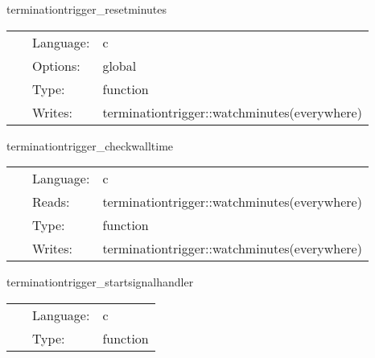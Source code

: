 \vspace{5mm}


\hspace{5mm} terminationtrigger\_resetminutes 

\hspace{5mm}{\it reset watchtime } 


\hspace{5mm}

 \begin{tabular*}{160mm}{cll} 
~ & Language:  & c \\ 
~ & Options:  & global \\ 
~ & Type:  & function \\ 
~ & Writes:  & terminationtrigger::watchminutes(everywhere) \\ 
\end{tabular*} 


\vspace{5mm}


\hspace{5mm} terminationtrigger\_checkwalltime 

\hspace{5mm}{\it check elapsed job walltime } 


\hspace{5mm}

 \begin{tabular*}{160mm}{cll} 
~ & Language:  & c \\ 
~ & Reads:  & terminationtrigger::watchminutes(everywhere) \\ 
~ & Type:  & function \\ 
~ & Writes:  & terminationtrigger::watchminutes(everywhere) \\ 
\end{tabular*} 


\vspace{5mm}


\hspace{5mm} terminationtrigger\_startsignalhandler 

\hspace{5mm}{\it start signal handler } 


\hspace{5mm}

 \begin{tabular*}{160mm}{cll} 
~ & Language:  & c \\ 
~ & Type:  & function \\ 
\end{tabular*} 


